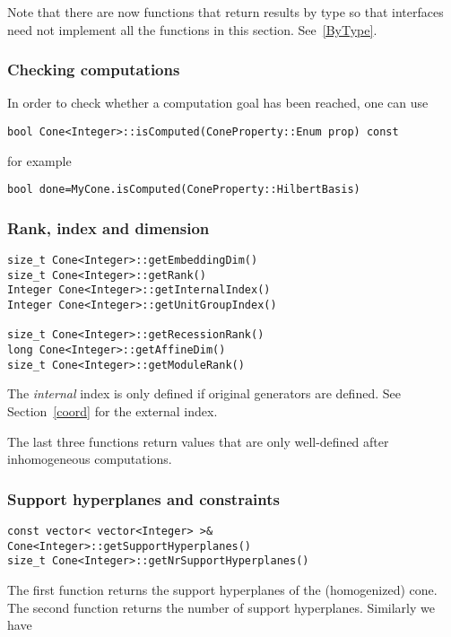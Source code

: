 \documentclass[12pt,a4paper]{scrartcl}
\theoremstyle{definition}
\begin{document}
\begin{small}
Note that there are now functions that return results by type so that interfaces need not implement all the functions in this section. See~\ref{ByType}.

\subsubsection{Checking computations}
In order to check whether a computation goal has been reached, one can use
\begin{Verbatim}
bool Cone<Integer>::isComputed(ConeProperty::Enum prop) const 
\end{Verbatim}
for example
\begin{Verbatim}
bool done=MyCone.isComputed(ConeProperty::HilbertBasis)
\end{Verbatim}

\subsubsection{Rank, index and dimension}

\begin{Verbatim}
size_t Cone<Integer>::getEmbeddingDim()
size_t Cone<Integer>::getRank()
Integer Cone<Integer>::getInternalIndex()
Integer Cone<Integer>::getUnitGroupIndex()

size_t Cone<Integer>::getRecessionRank()
long Cone<Integer>::getAffineDim()
size_t Cone<Integer>::getModuleRank()
\end{Verbatim}

The \emph{internal} index is only defined if original generators are defined. See Section~\ref{coord} for the external index.

The last three functions return values that are only well-defined after inhomogeneous computations.

\subsubsection{Support hyperplanes and constraints}\label{SHC}

\begin{Verbatim}
const vector< vector<Integer> >& Cone<Integer>::getSupportHyperplanes()
size_t Cone<Integer>::getNrSupportHyperplanes()
\end{Verbatim}

The first function returns the support hyperplanes of the (homogenized) cone.
The second function returns the number of support hyperplanes. Similarly we have


\end{small}
\end{document}
